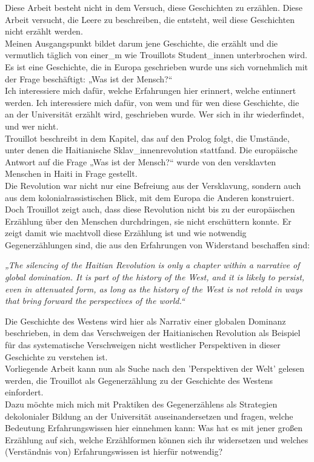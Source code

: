 \noindent Diese Arbeit besteht nicht in dem Versuch, diese Geschichten zu erzählen. Diese
Arbeit versucht, die Leere zu beschreiben, die entsteht, weil diese Geschichten
nicht erzählt werden.\\

\noindent Meinen Ausgangspunkt bildet darum jene Geschichte, die erzählt und
die vermutlich täglich von einer\_m wie Trouillots Student\_innen unterbrochen
wird. Es ist eine Geschichte, die in Europa geschrieben wurde uns sich
vornehmlich mit der Frage beschäftigt: „Was ist der Mensch?“ \\
Ich interessiere
mich dafür, welche Erfahrungen hier erinnert, welche entinnert werden. Ich
interessiere mich dafür, von wem und für wen diese Geschichte, die an der
Universität erzählt wird, geschrieben wurde. Wer sich in ihr wiederfindet, und
wer nicht.\\

Trouillot beschreibt in dem Kapitel, das auf den Prolog folgt, die Umstände,
unter denen die Haitianische Sklav\_innenrevolution stattfand. Die europäische
Antwort auf die Frage „Was ist der Mensch?“ wurde von den versklavten Menschen
in Haiti in Frage gestellt. \\
Die Revolution war nicht nur eine Befreiung aus der
Versklavung, sondern auch aus dem kolonialrassistischen Blick, mit dem Europa
die Anderen konstruiert. Doch Trouillot zeigt auch, dass diese Revolution nicht
bis zu der europäischen Erzählung über den Menschen durchdringen, sie nicht
erschüttern konnte. Er zeigt damit wie machtvoll diese Erzählung ist und wie
notwendig Gegenerzählungen sind, die aus den Erfahrungen von Widerstand
beschaffen sind:
\begin{myenv}
  \textit{„The silencing of the Haitian Revolution is only a chapter within a
  narrative of global domination. It is part of the history of the West, and it
is likely to persist, even in attenuated form, as long as the history of the
West is not retold in ways that bring forward the perspectives of the
world.“\footnotemark{}}
\end{myenv}
Die Geschichte des Westens wird hier als Narrativ einer globalen Dominanz
beschrieben, in dem das Verschweigen der Haitianischen Revolution als Beispiel
für das systematische Verschweigen nicht westlicher Perspektiven in dieser
Geschichte zu verstehen ist.\\ 

\noindent Vorliegende Arbeit kann nun als Suche nach den 'Perspektiven der Welt' gelesen
werden, die Trouillot als Gegenerzählung zu der Geschichte des Westens
einfordert.\\
Dazu möchte mich mich mit Praktiken des Gegenerzählens als Strategien
dekolonialer Bildung an der Universität auseinandersetzen und fragen, welche
Bedeutung Erfahrungswissen hier einnehmen kann: Was hat es mit jener großen
Erzählung auf sich, welche Erzählformen können sich ihr widersetzen und welches
(Verständnis von) Erfahrungswissen ist hierfür notwendig?


